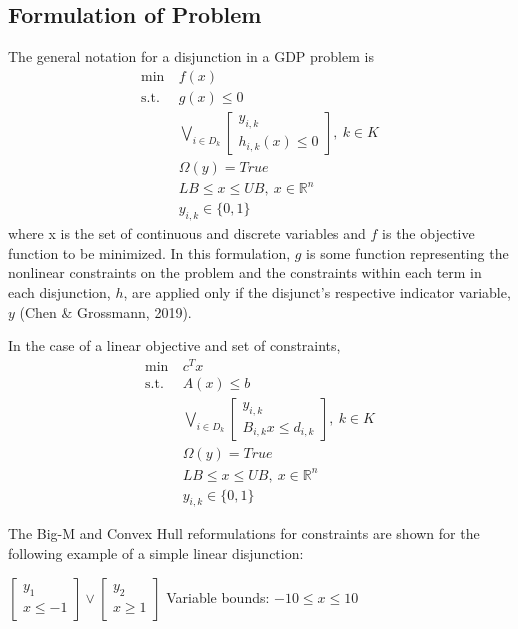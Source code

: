 \documentclass{juliacon}
\begin{document}
\subsection{Formulation of Problem}
The general notation for a disjunction in a GDP problem is
\begin{align*}
    \min \ &f(x) \\
    \text{s.t.} \ &g(x) \leq 0 \\
    &\bigvee_{i \in D_k}
    \begin{bmatrix}
        y_{i,k} \\
        h_{i,k}(x) \leq 0
    \end{bmatrix}, \ k \in K \\
    & \Omega(y) = True \\
    &LB \leq x \leq UB, \ 
    x \in \mathbb{R}^n \\
    & y_{i,k} \in \{0, 1\}
\end{align*}
where x is the set of continuous and discrete variables and $f$ is the objective function to be minimized. In this formulation, $g$ is some function representing the nonlinear constraints on the problem and the constraints within each term in each disjunction, $h$, are applied only if the disjunct's respective indicator variable, $y$ (Chen \& Grossmann, 2019).

In the case of a linear objective and set of constraints,
\begin{align*}
    \min \ & c^Tx \\
    \text{s.t.} \ &A(x) \leq b \\
    &\bigvee_{i \in D_k}
    \begin{bmatrix}
        y_{i,k} \\
       B_{i,k}x \leq d_{i,k}
    \end{bmatrix}, \ k \in K \\
    & \Omega(y) = True \\
    &LB \leq x \leq UB, \ 
    x \in \mathbb{R}^n \\
    & y_{i,k} \in \{0, 1\}
\end{align*}

\vskip 6pt
The Big-M and Convex Hull reformulations for constraints are shown for the following example of a simple linear disjunction:
\vskip 6pt
\begin{center}
$
\begin{bmatrix}
y_1 \\ x \leq -1
\end{bmatrix}
\lor
\begin{bmatrix}
    y_2 \\ x \geq 1
\end{bmatrix} $
\vskip 5pt
Variable bounds:  $-10 \leq x \leq 10$
\end{center}
\end{document}

